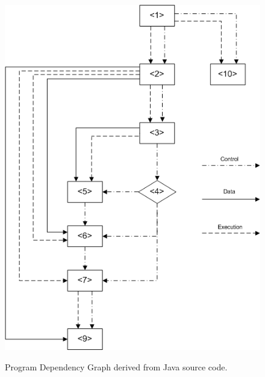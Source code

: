 \documentclass{report}
\begin{document}
\begin{figure}[h]
  \centering
  \includegraphics[scale=0.55]{Figures/exist-alg/pdg-example.png}\\[0.1cm]
  \caption[Example of program dependency graph derived from java code]{Program Dependency Graph derived from Java source code.}
  \label{fig:pdg-ex}
\end{figure}
\end{document}
